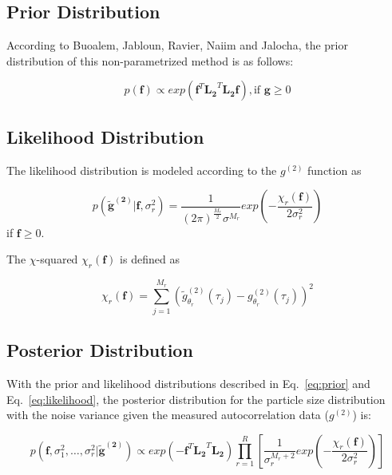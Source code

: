 \documentclass[11pt]{article}
\begin{document}
\subsection{Prior Distribution}
According to Buoalem, Jabloun, Ravier, Naiim and Jalocha, the prior distribution of this non-parametrized method is as follows:

\begin{equation}\label{eq:prior}
p(\mathbf{f}) \propto exp\left( \mathbf{f}^{T} \mathbf{L_2}^{T}\mathbf{L_2}\mathbf{f} \right), \textrm{if } \mathbf{g} \geq 0
\end{equation}

\subsection{Likelihood Distribution}
The likelihood distribution is modeled according to the $g^{(2)}$ function as 

\begin{equation} \label{eq:likelihood}
p(\mathbf{\tilde{g}^{(2)}} | \mathbf{f}, \sigma^{2}_r ) = \frac{1}{{(2\pi)}^{\frac{M_r}{2}} \sigma^{M_r}}exp\left( -\frac{\chi_r(\mathbf{f})}{2\sigma^2_r}\right)
\end{equation}
if $\mathbf{f} \geq 0$.

The $\chi$-squared $\chi_r(\mathbf{f})$ is defined as 

\begin{equation}
\chi_r(\mathbf{f}) = \sum_{j=1}^{M_r} {\left( \tilde{g}_{\theta_r}^{(2)} (\tau_j) - g_{\theta_r}^{(2)} (\tau_j) \right)}^2
\end{equation}

\subsection{Posterior Distribution}
With the prior and likelihood distributions described in Eq.~\ref{eq:prior} and Eq.~\ref{eq:likelihood}, the posterior distribution for the particle size distribution with the noise variance given the measured autocorrelation data ($g^{(2)}$) is: 

\begin{equation}\label{eq:posterior}
p(\mathbf{f}, \sigma_1^2,\ldots, \sigma_r^2|\mathbf{\tilde{g}^{(2)}}) \propto exp \left( -\mathbf{f}^T\mathbf{L_2}^T\mathbf{L_2} \right) \prod_{r=1}^{R} \left[ \frac{1}{\sigma_r^{M_r+2}} exp \left( -\frac{\chi_r(\mathbf{f})}{2\sigma_r^2} \right) \right]
\end{equation}
\end{document}
